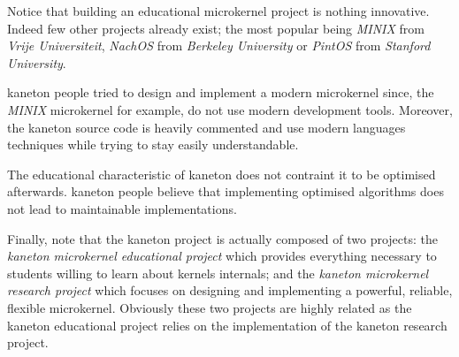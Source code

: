 Notice that building an educational microkernel project is nothing innovative.
Indeed few other projects already exist; the most popular being \textit{MINIX}
from \textit{Vrije Universiteit}, \textit{NachOS} from \textit{Berkeley
University} or \textit{PintOS} from \textit{Stanford University}.

kaneton people tried to design and implement a modern microkernel since, the
\textit{MINIX} microkernel for example, do not use modern development tools.
Moreover, the kaneton source code is heavily commented and use modern
languages techniques while trying to stay easily understandable.

The educational characteristic of kaneton does not contraint it to be
optimised afterwards. kaneton people believe that implementing optimised
algorithms does not lead to maintainable implementations.

Finally, note that the kaneton project is actually composed of two projects:
the \textit{kaneton microkernel educational project} which provides everything
necessary to students willing to learn about kernels internals; and the
\textit{kaneton microkernel research project} which focuses on designing and
implementing a powerful, reliable, flexible microkernel. Obviously these
two projects are highly related as the kaneton educational project relies on
the implementation of the kaneton research project.

